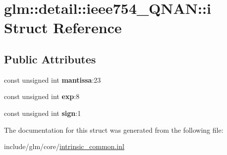 \hypertarget{structglm_1_1detail_1_1ieee754__QNAN_1_1i}{\section{glm\-:\-:detail\-:\-:ieee754\-\_\-\-Q\-N\-A\-N\-:\-:i \-Struct \-Reference}
\label{structglm_1_1detail_1_1ieee754__QNAN_1_1i}
}
\subsection*{\-Public \-Attributes}
\begin{DoxyCompactItemize}
\item 
\hypertarget{structglm_1_1detail_1_1ieee754__QNAN_1_1i_a1999926defcba631a716bee7d3044d0a}{const unsigned int {\bfseries mantissa}\-:23}\label{structglm_1_1detail_1_1ieee754__QNAN_1_1i_a1999926defcba631a716bee7d3044d0a}

\item 
\hypertarget{structglm_1_1detail_1_1ieee754__QNAN_1_1i_abc8cdb38ff3aa6a09214f7bfa32efac8}{const unsigned int {\bfseries exp}\-:8}\label{structglm_1_1detail_1_1ieee754__QNAN_1_1i_abc8cdb38ff3aa6a09214f7bfa32efac8}

\item 
\hypertarget{structglm_1_1detail_1_1ieee754__QNAN_1_1i_a5dd7e174864b6a8cd045563dde44f305}{const unsigned int {\bfseries sign}\-:1}\label{structglm_1_1detail_1_1ieee754__QNAN_1_1i_a5dd7e174864b6a8cd045563dde44f305}

\end{DoxyCompactItemize}


\-The documentation for this struct was generated from the following file\-:\begin{DoxyCompactItemize}
\item 
include/glm/core/\hyperlink{intrinsic__common_8inl}{intrinsic\-\_\-common.\-inl}\end{DoxyCompactItemize}
